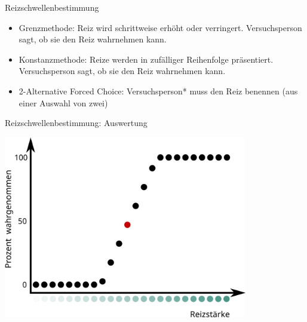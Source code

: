 \documentclass{beamer}
\begin{document}


\begin{frame}{Reizschwellenbestimmung}

\begin{itemize}
    \item 
    Grenzmethode: Reiz wird schrittweise erhöht oder verringert. Versuchsperson sagt, ob sie den Reiz wahrnehmen kann.
    \item
    Konstanzmethode: Reize werden in zufälliger Reihenfolge präsentiert. Versuchsperson sagt, ob sie den Reiz wahrnehmen kann.
    \item
    2-Alternative Forced Choice: Versuchsperson* muss den Reiz benennen (aus einer Auswahl von zwei) 
\end{itemize}

\end{frame}





\begin{frame}{Reizschwellenbestimmung: Auswertung}

\begin{center}
    \includegraphics[width=0.8\textwidth]{reizschwellen_diagramm.png}
\end{center}

\end{frame}


\end{document}
